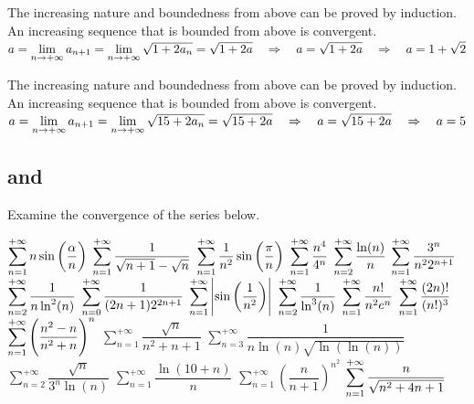 \begin{Answer}

    \Question The increasing nature and boundedness from above can be proved by induction. An increasing  sequence that is bounded from above is convergent. \\[0.2cm]
    $a = \displaystyle\lim_{n \to +\infty} a_{n+1}=\displaystyle\lim_{n \to +\infty} \sqrt{1+2a_{n}} = \sqrt{1+2a} \quad \Rightarrow \quad a=\sqrt{1+2a} \quad \Rightarrow \quad a = 1 + \sqrt{2}$
    
    \Question The increasing nature and boundedness from above can be proved by induction. An increasing  sequence that is bounded from above is convergent.  \\[0.2cm]
    $a = \displaystyle\lim_{n \to +\infty} a_{n+1}=\displaystyle\lim_{n \to +\infty} \sqrt{15+2a_{n}} = \sqrt{15+2a} \quad \Rightarrow \quad a=\sqrt{15+2a} \quad \Rightarrow \quad a = 5$
    
\end{Answer}

\pagebreak
\subsection*{ and }
\begin{Exercise} Examine the convergence of the series below.
\begin{multicols}{2}
    \Question[difficulty = 2] $\displaystyle\sum_{n=1}^{+\infty} n \sin \left( \dfrac{\alpha}{n}\right)$
    \Question[difficulty = 1] $\displaystyle\sum_{n=1}^{+\infty} \dfrac{1}{\sqrt{n+1} - \sqrt{n}}$
    \Question[difficulty = 2] $\displaystyle\sum_{n=1}^{+\infty} \dfrac{1}{n^2} \sin \left(\dfrac {\pi}{n} \right)$
    \Question[difficulty = 2] $\displaystyle\sum_{n=1}^{+\infty} \dfrac{n^4}{4^n}$
    \Question[difficulty = 2] $\displaystyle\sum_{n=2}^{+\infty} \dfrac{\ln (n)}{n}$
    \Question[difficulty = 3] $\displaystyle\sum_{n=1}^{+\infty} \dfrac{3^n}{n^2 2^{n+1}}$ 
    \Question[difficulty = 3] $ \displaystyle\sum_{n=2}^{+\infty} \dfrac{1}{n \ln^2 (n)} $
    \Question[difficulty = 2] $\displaystyle\sum_{n=0}^{+\infty}  \dfrac{1}{(2n+1) 2^{2n+1}} $
    \Question[difficulty = 3] $\displaystyle\sum_{n=1}^{+\infty} \left| \sin \left(\dfrac{1}{n^2} \right) \right| $
    \Question[difficulty = 3] $ \displaystyle\sum_{n=2}^{+\infty} \dfrac{1}{\ln^3 (n)}$
    \Question[difficulty = 2] $\displaystyle\sum_{n=1}^{+\infty} \dfrac{n!}{n^2 e^n}$
    \Question[difficulty = 2] $\displaystyle\sum_{n=1}^{+\infty} \dfrac{(2n)!}{(n!)^3}$
    \Question[difficulty = 3] $\displaystyle\sum_{n=1}^{+\infty}\left(  \dfrac{n^2-n}{n^2+n}  \right)^n$ 
    \Question[difficulty = 3]  $\displaystyle\sum_{n=1}^{+\infty} \dfrac{\sqrt{n}}{n^2+n+1}$  
    \Question[difficulty = 3]  $\displaystyle\sum_{n=3}^{+\infty} \dfrac{1}{n \ln (n) \sqrt{\ln (\ln (n))}}$ 
    \Question[difficulty = 2] $\displaystyle\sum_{n=2}^{+\infty} \dfrac{\sqrt{n}}{3^n \ln (n)}$  
    \Question[difficulty = 3] $\displaystyle\sum_{n=1}^{+\infty} \dfrac{\ln(10+n)}{n}$
    \Question[difficulty = 3] $\displaystyle\sum_{n=1}^{+\infty} \left( \dfrac{n}{n+1} \right)^{n^2}$
    \Question[difficulty = 2] $\displaystyle\sum_{n=1}^{+\infty} \dfrac{n}{\sqrt{n^2+4n+1}} $
    \EndCurrentQuestion
\end{multicols}
\end{Exercise}

